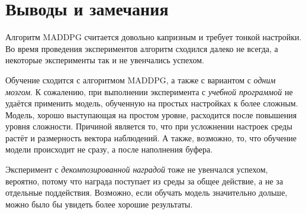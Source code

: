 





\section{Выводы и замечания}

Алгоритм MADDPG считается довольно капризным и требует тонкой настройки. Во время проведения экспериментов алгоритм сходился далеко не всегда, а некоторые эксперименты так и не увенчались успехом.

Обучение сходится с алгоритмом MADDPG, а также с вариантом с \textit{одним мозгом}. К сожалению, при выполнении эксперимента с \textit{учебной программой} не удаётся применить модель, обученную на простых настройках к более сложным. Модель, хорошо выступающая на простом уровне, расходится после повышения уровня сложности. Причиной является то, что при усложнении настроек среды растёт и размерность вектора наблюдений. А также, возможно, то, что обучение модели происходит не сразу, а после наполнения буфера.

Эксперимент с \textit{декомпозированной наградой} тоже не увенчался успехом, вероятно, потому что награда поступает из среды за общее действие, а не за отдельные поддействия. Возможно, если обучать модель значительно дольше, можно было бы увидеть более хорошие результаты.


\newpage
